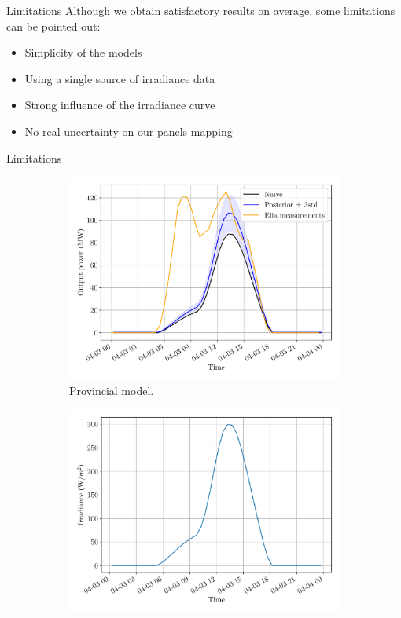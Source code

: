 \documentclass[12pt]{beamer}
\begin{document}
\begin{frame}{Limitations}
    Although we obtain satisfactory results on average, some \alert{limitations} can be pointed out:
    \begin{itemize}
        \item \alert{Simplicity} of the models
        \item Using a \alert{single} source of irradiance data
        \item Strong \alert{influence} of the irradiance curve
        \item No real \alert{uncertainty} on our panels mapping
    \end{itemize}
\end{frame}

\begin{frame}{Limitations}
    \begin{figure}
    	\begin{subfigure}{0.48\textwidth}
		\centering
		\includegraphics[width=\textwidth]{resources/pdf/solar_provincial_meas_for_START_FOR_03-04-2020.pdf}
		\caption{Provincial model.}
	\end{subfigure}
	\hspace{0em}
	\begin{subfigure}{0.48\textwidth}
		\centering
		\includegraphics[width=\textwidth]{resources/pdf/irradiance_for_for_START_FOR_03-04-2020.pdf}

\end{subfigure}
\end{figure}
\end{frame}
\end{document}
